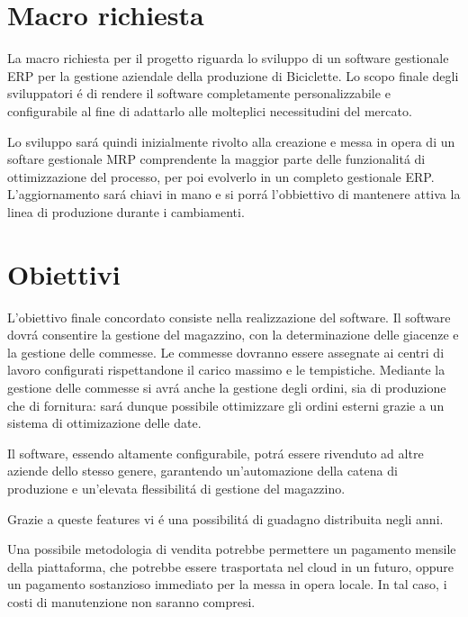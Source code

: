 \documentclass[../../documentazione.tex]{subfiles}
\begin{document}
    \section{Macro richiesta}\label{sec:macro-richiesta}

    La macro richiesta per il progetto riguarda lo sviluppo di un software gestionale ERP per la gestione aziendale
    della produzione di Biciclette.
    Lo scopo finale degli sviluppatori é di rendere il software completamente personalizzabile e configurabile
    al fine di adattarlo alle molteplici necessitudini del mercato.

    Lo sviluppo sará quindi inizialmente rivolto alla creazione e messa in opera di un softare gestionale MRP
    comprendente la maggior parte delle funzionalitá di ottimizzazione del processo, per poi evolverlo in un completo
    gestionale ERP.
    L'aggiornamento sará chiavi in mano e si porrá l'obbiettivo di mantenere attiva la linea di produzione
    durante i cambiamenti.

    \section{Obiettivi}\label{sec:obiettivi}

    L'obiettivo finale concordato consiste nella realizzazione del software.
    Il software dovrá consentire la gestione del magazzino, con la determinazione delle giacenze e la gestione delle commesse.
    Le commesse dovranno essere assegnate ai centri di lavoro configurati rispettandone il carico massimo e le tempistiche.
    Mediante la gestione delle commesse si avrá anche la gestione degli ordini, sia di produzione che di fornitura:
    sará dunque possibile ottimizzare gli ordini esterni grazie a un sistema di ottimizazione delle date.

    Il software, essendo altamente configurabile, potrá essere rivenduto ad altre aziende dello stesso genere,
    garantendo un'automazione della catena di produzione e un'elevata flessibilitá di gestione del magazzino.

    Grazie a queste features vi é una possibilitá di guadagno distribuita negli anni.

    Una possibile metodologia di vendita potrebbe permettere un pagamento mensile della piattaforma, che potrebbe essere
    trasportata nel cloud in un futuro, oppure un pagamento sostanzioso immediato per la messa in opera locale.
    In tal caso, i costi di manutenzione non saranno compresi.
\end{document}
